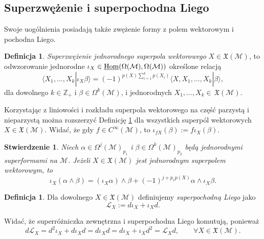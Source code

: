 \documentclass[11pt,a4paper]{report}
\newtheorem{proposition}[theorem]{Stwierdzenie}
\theoremstyle{definition}
\newtheorem{definition}[theorem]{Definicja}
\begin{document}
\subsection{Superzwężenie i superpochodna Liego}
			      				
Swoje uogólnienia posiadają także zwężenie formy z polem wektorowym i pochodna Liego.
			      				
\begin{definition}
	\label{def:supercontraction}
	\textit{Superzwężenie jednorodnego superpola wektorowego} $X\in \mathfrak{X}(\mathcal{M})$, to odwzorowanie jednorodne $\iota_X\in\underline{{\rm Hom}}(\Omega({\mathcal{M}}),\Omega({\mathcal{M}}))$ określone relacją
	\begin{equation*}
		\langle X_1,\ldots,X_k|\iota_X \beta\rangle=(-1)^{p(X)\sum_{i=1}^k p(X_i)}\langle X,X_1,\ldots,X_k|\beta\rangle,
	\end{equation*}
	dla dowolnego $k \in \mathbb{Z}_+$ i $\beta \in \Omega^{k}({\mathcal{M}})$, i jednorodnych $X_1,\ldots,X_k\in \,\mathfrak{X}(\mathcal{M})$.
\end{definition}
			      				
Korzystając z liniowości i rozkładu superpola wektorowego na część parzystą i nieparzystą można rozszerzyć Definicję \ref{def:supercontraction} dla wszystkich superpól wektorowych $X \in \mathfrak{X}(\mathcal{M})$. Widać, że gdy $f \in C^\infty(\mathcal{M})$, to $\iota_{fX} (\beta) := f \iota_X (\beta).$
			      				
\begin{proposition} 
	\label{prop:supercontraction_property}
	Niech $\alpha \in \Omega^j (\mathcal{M})_{p_1}\!$ i $\beta\in \Omega^k (\mathcal{M})_{p_2}$ będą jednorodnymi superformami na $\mathcal{M}$. Jeżeli $X\in \mathfrak{X}(\mathcal{M})$ jest jednorodnym superpolem wektorowym, to
	\begin{equation*}
		\iota_X(\alpha\wedge\beta)=(\iota_X\alpha)\wedge \beta+(-1)^{j+p_1 p(X)}\alpha\wedge \iota_X\beta.
	\end{equation*}
\end{proposition}
			      				
\begin{definition} Dla dowolnego $X\in \mathfrak{X}(\mathcal{M})$ definiujemy \textit{superpochodną Liego} jako
	\begin{equation*}
		\mathcal{L}_X:=d\iota_X+\iota_Xd.
	\end{equation*}
\end{definition}
Widać, że superróżniczka zewnętrzna i superpochodna Liego komutują, ponieważ
\begin{equation*}
	d\mathcal{L}_X = d^2\iota_{X}+d\iota_Xd=d\iota_Xd=d\iota_X+\iota_Xd^2=\mathcal{L}_Xd,\qquad \forall X\in \mathfrak{X}(\mathcal{M}).
\end{equation*}
			      				
\end{document}
